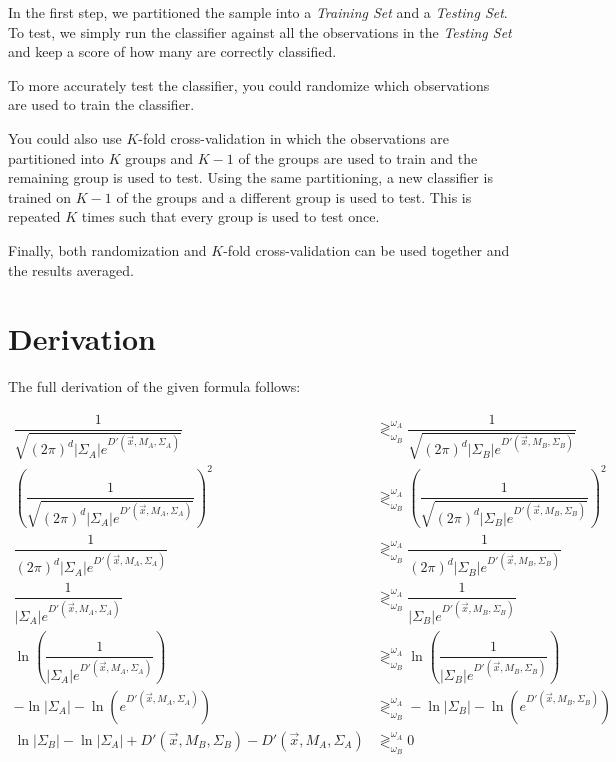 \documentclass{article}
\begin{document}
In the first step, we partitioned the sample into a \emph{Training
  Set} and a \emph{Testing Set}.  To test, we simply run the
  classifier against all the observations in the \emph{Testing Set}
  and keep a score of how many are correctly classified.

To more accurately test the classifier, you could randomize which
observations are used to train the classifier.

You could also use $K$-fold cross-validation in which the observations
are partitioned into $K$ groups and $K-1$ of the groups are used to
train and the remaining group is used to test.  Using the same
partitioning, a new classifier is trained on $K-1$ of the groups and a
different group is used to test.  This is repeated $K$ times such that
every group is used to test once.

Finally, both randomization and $K$-fold cross-validation can be used
together and the results averaged.

\appendix
\section{Derivation}
\label{app:derivation}

The full derivation of the given formula follows:

\begin{align*}
  \dfrac{1}{\sqrt{(2\pi)^d |\Sigma_A| e^{D'(\vec{x},M_A,\Sigma_A)}}} 
  &\gtrless^{\omega_A}_{\omega_B}
  \dfrac{1}{\sqrt{(2\pi)^d |\Sigma_B| e^{D'(\vec{x},M_B,\Sigma_B)}}} \\
  \left(\dfrac{1}{\sqrt{(2\pi)^d |\Sigma_A| e^{D'(\vec{x},M_A,\Sigma_A)}}}\right)^2
  &\gtrless^{\omega_A}_{\omega_B}
  \left(\dfrac{1}{\sqrt{(2\pi)^d |\Sigma_B| e^{D'(\vec{x},M_B,\Sigma_B)}}}\right)^2 \\
  \dfrac{1}{(2\pi)^d |\Sigma_A| e^{D'(\vec{x},M_A,\Sigma_A)}}
  &\gtrless^{\omega_A}_{\omega_B}
  \dfrac{1}{(2\pi)^d |\Sigma_B| e^{D'(\vec{x},M_B,\Sigma_B)}} \\
  \dfrac{1}{|\Sigma_A| e^{D'(\vec{x},M_A,\Sigma_A)}}
  &\gtrless^{\omega_A}_{\omega_B}
  \dfrac{1}{|\Sigma_B| e^{D'(\vec{x},M_B,\Sigma_B)}} \\
  \ln\left(\dfrac{1}{|\Sigma_A| e^{D'(\vec{x},M_A,\Sigma_A)}}\right)
  &\gtrless^{\omega_A}_{\omega_B}
  \ln\left(\dfrac{1}{|\Sigma_B| e^{D'(\vec{x},M_B,\Sigma_B)}}\right) \\
  -\ln|\Sigma_A| - \ln(e^{D'(\vec{x},M_A,\Sigma_A)})
  &\gtrless^{\omega_A}_{\omega_B}
  -\ln|\Sigma_B| - \ln(e^{D'(\vec{x},M_B,\Sigma_B)}) \\
  \ln|\Sigma_B| - \ln|\Sigma_A| +
  D'(\vec{x},M_B,\Sigma_B) - D'(\vec{x},M_A,\Sigma_A)
  &\gtrless^{\omega_A}_{\omega_B}
  0
\end{align*}


\end{document}
